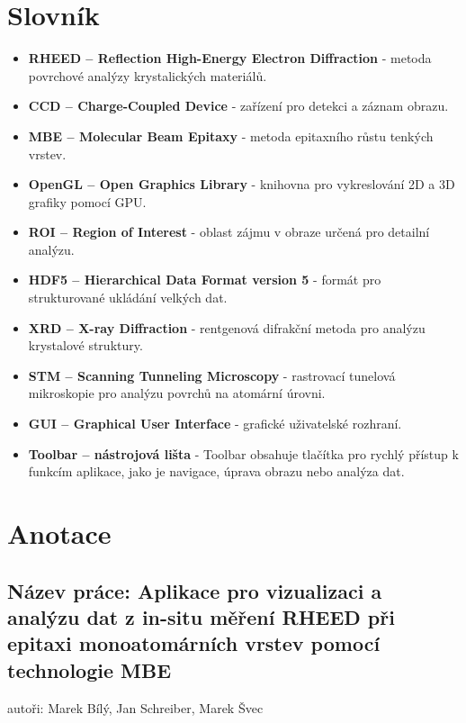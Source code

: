 \documentclass[a4paper,11pt]{article}
\begin{document}
\section{Slovník}
\begin{itemize}
\item \textbf{RHEED – Reflection High-Energy Electron Diffraction} - metoda povrchové analýzy krystalických materiálů.\\
\item \textbf{CCD – Charge-Coupled Device} - zařízení pro detekci a záznam obrazu.\\
\item \textbf{MBE – Molecular Beam Epitaxy} - metoda epitaxního růstu tenkých vrstev.\\
\item \textbf{OpenGL – Open Graphics Library} - knihovna pro vykreslování 2D a 3D grafiky pomocí GPU.\\
\item \textbf{ROI – Region of Interest} - oblast zájmu v obraze určená pro detailní analýzu.\\
\item \textbf{HDF5 – Hierarchical Data Format version 5} - formát pro strukturované ukládání velkých dat.\\
\item \textbf{XRD – X-ray Diffraction} - rentgenová difrakční metoda pro analýzu krystalové struktury.\\
\item \textbf{STM – Scanning Tunneling Microscopy} - rastrovací tunelová mikroskopie pro analýzu povrchů na atomární úrovni.\\
\item \textbf{GUI – Graphical User Interface} - grafické uživatelské rozhraní.\\
\item \textbf{Toolbar – nástrojová lišta} - Toolbar obsahuje tlačítka pro rychlý přístup k funkcím aplikace, jako je navigace, úprava obrazu nebo analýza dat.
\end{itemize}
\newpage

\section*{Anotace}

\subsection*{Název práce: Aplikace pro vizualizaci a analýzu dat z in-situ měření RHEED při epitaxi monoatomárních vrstev pomocí technologie MBE}
autoři: Marek Bílý, Jan Schreiber, Marek Švec
\vspace{0.5cm}
\end{document}
